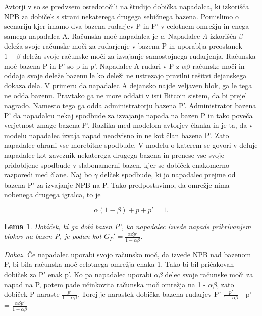 \documentclass[12pt]{article}
\newtheorem{lema}{Lema}
\begin{document}
Avtorji v \cite{powersplitting} so se predvsem osredotočili na študijo dobička napadalca, ki izkorišča NPB za dobiček s strani nekaterega drugega sebičnega bazena. Pomislimo o scenariju kjer imamo dva bazena rudarjev P in P' v celotnem omrežju in enega samega napadalca A. Računska moč napadalca je \textit{a}. Napadalec \textit{A} izkorišča $\beta$ deleža svoje računske moči za rudarjenje v bazenu P in uporablja preostanek $1-\beta$ deleža svoje računske moči za izvajanje samostojnega rudarjenja. Računska moč bazena P in P' so p in p'. Napadalec A rudari v P  z $\alpha \beta $ računske moči in oddaja svoje deleže bazenu le ko deleži ne ustrezajo pravilni rešitvi dejanskega dokaza dela. V primeru da napadalec A dejansko najde veljaven blok, ga le tega ne odda bazenu. Pravtako ga ne more oddati v isti Bitcoin sistem, da bi prejel nagrado. Namesto tega ga odda administratorju bazena P'. Administrator bazena P' da napadalcu nekaj spodbude za izvajanje napada na bazen P in tako poveča verjetnost zmage bazena P'. Razlika med modelom avtorjev članka \cite{originalarticle} in \cite{minnersdilemma} je ta, da v modelu \cite{originalarticle} napadalec izvaja napad neodvisno in ne kot član bazena P'. Zato napadalec ohrani vse morebitne spodbude. V modelu o katerem se govori v \cite{minnersdilemma} deluje napadalec kot zaveznik nekaterega drugega bazena in prenese vse svoje pridobljene spodbude v slabonamerni bazen, kjer se dobiček enakomerno razporedi med člane. Naj bo $\gamma$ delček spodbude, ki jo napadalec prejme od bazena P' za izvajanje NPB na P. Tako predpostavimo, da omrežje nima nobenega drugega igralca, to je

\begin{equation} \label{equation:player}
\alpha(1-\beta) + p + p' = 1 .
\end{equation}

\begin{lema}
	Dobiček, ki ga dobi bazen P', ko napadalec izvede napads prikrivanjem blokov na bazen P, je podan kot  $ G_P$$'= \frac{\alpha \beta p'}{1-\alpha \beta}$.
\end{lema}
\noindent\textit{Dokaz.} Če napadalec uporabi svojo računsko moč, da izvede NPB nad bazenom P, bi bila računska moč celotnega omrežja enaka 1. Tako bi bil pričakovan dobiček za P'  enak p'. Ko pa napadalec uporabi \textit{ $\alpha \beta$} delec svoje računske moči za napad na P, potem pade učinkovita računska moč omrežja na 1 - $\alpha\beta$, zato  dobiček P naraste $\frac{p'}{ 1 - \alpha\beta}$.  Torej je narastek dobička bazena rudarjev P'  $\frac{p'}{1 - \alpha\beta}$ - p' = $\frac{\alpha\beta p'}{1 - \alpha\beta}$
\end{document}
